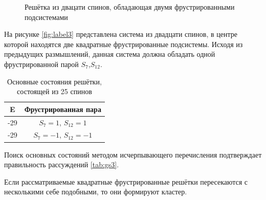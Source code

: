 \documentclass[utf8, babel, sor, jor, amsmath,amssymb, reprint]{elsarticle} %
\begin{document}
\begin{figure}[h]
	\centering
	\caption{Решётка из двацати спинов, обладающая двумя фрустрированными подсистемами}
	\label{fig:label3}
\end{figure}

На рисунке \eqref{fig:label3} представлена система из двадцати спинов, в центре которой находятся две квадратные фрустрированные подсистемы. Исходя из предыдущих размышлений, данная система должна обладать одной фрустрированной парой  $S_7$,$S_12$.

\begin{table}[h]
	\centering
	\begin{tabular}{|c|c|}
		\hline
		E   &   Фрустрированная пара \\
		\hline
		-29   &  $S_7=1$, $S_{12}=1$ \\
		\hline
		-29   &   $S_7=-1$, $S_{12}=-1$ \\
		\hline
	\end{tabular}
	\caption{Основные состояния решётки, состоящей из 25 спинов}
	\label{tab:gs3}
\end{table}

Поиск основных состояний методом исчерпывающего перечисления подтверждает правильность рассуждений \eqref{tab:gs3}.

Если рассматриваемые квадратные фрустрированные решётки пересекаются с несколькими себе подобными, то они формируют кластер.
\end{document}
